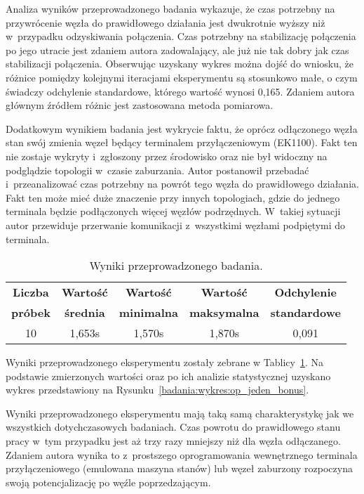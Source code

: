 Analiza wyników przeprowadzonego badania wykazuje, że czas potrzebny na przywrócenie węzła do prawidłowego działania jest dwukrotnie wyższy niż w~przypadku odzyskiwania połączenia. Czas potrzebny na stabilizację połączenia po jego utracie jest zdaniem autora zadowalający, ale już nie tak dobry jak czas stabilizacji połączenia. Obserwując uzyskany wykres można dojść do wniosku, że różnice pomiędzy kolejnymi iteracjami eksperymentu są stosunkowo małe, o czym świadczy odchylenie standardowe, którego wartość wynosi 0,165. Zdaniem autora głównym źródłem różnic jest zastosowana metoda pomiarowa.

Dodatkowym wynikiem badania jest wykrycie faktu, że oprócz odłączonego węzła stan swój zmienia węzeł będący terminalem przyłączeniowym (EK1100). Fakt ten nie zostaje wykryty i~zgłoszony przez środowisko oraz nie był widoczny na podglądzie topologii w~czasie zaburzania. Autor postanowił przebadać i~przeanalizować czas potrzebny na powrót tego węzła do prawidłowego działania. Fakt ten może mieć duże znaczenie przy innych topologiach, gdzie do jednego terminala będzie podłączonych więcej węzłów podrzędnych. W~takiej sytuacji autor przewiduje przerwanie komunikacji z~wszystkimi węzłami podpiętymi do terminala.

\begin{table}[!htb]
\begin{center}
\begin{tabular}{| c | c | c | c | c |}\hline
\textbf{Liczba} & \textbf{Wartość} & \textbf{Wartość} & \textbf{Wartość} & \textbf{Odchylenie} \\
\textbf{próbek} & \textbf{średnia} & \textbf{minimalna} & \textbf{maksymalna} & \textbf{standardowe} \\\hline\hline
10 & 1,653s & 1,570s & 1,870s & 0,091\\\hline
\end{tabular}
\end{center}
\vspace*{-6mm}
  \caption{Wyniki przeprowadzonego badania.}
	\label{badania:wyniki:op_jeden_bonus}
\end{table}

Wyniki przeprowadzonego eksperymentu zostały zebrane w Tablicy~\ref{badania:wyniki:op_jeden_bonus}. Na podstawie zmierzonych wartości oraz po ich analizie statystycznej uzyskano wykres przedstawiony na Rysunku~\ref{badania:wykres:op_jeden_bonus}.


Wyniki przeprowadzonego eksperymentu mają taką samą charakterystykę jak we wszystkich dotychczasowych badaniach. Czas powrotu do prawidłowego stanu pracy w~tym przypadku jest aż trzy razy mniejszy niż dla węzła odłączanego. Zdaniem autora wynika to z~prostszego oprogramowania wewnętrznego terminala przyłączeniowego (emulowana maszyna stanów) lub węzeł zaburzony rozpoczyna swoją potencjalizację po węźle poprzedzającym.

